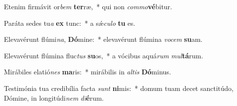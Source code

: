 \item Etenim firmávit or\textit{bem} \textbf{ter}ræ,~* qui non \textit{com}\textit{mo}\textbf{vé}bitur.
\item Paráta sedes tu\textit{a} \textbf{ex} tunc:~* a sǽ\textit{cu}\textit{lo} \textbf{tu} es.
\item Elevavérunt flúmi\textit{na}, \textbf{Dó}mine:~* elevavérunt flúmina \textit{vo}\textit{cem} \textbf{su}am.
\item Elevavérunt flúmina fluc\textit{tus} \textbf{su}os,~* a vócibus aquá\textit{rum} \textit{mul}\textbf{tá}rum.
\item Mirábiles elatió\textit{nes} \textbf{ma}ris:~* mirábilis in \textit{al}\textit{tis} \textbf{Dó}minus.
\item Testimónia tua credibília facta \textit{sunt} \textbf{ni}mis:~* domum tuam decet sanctitúdo, Dómine, in longitúdi\textit{nem} \textit{di}\textbf{é}rum.
